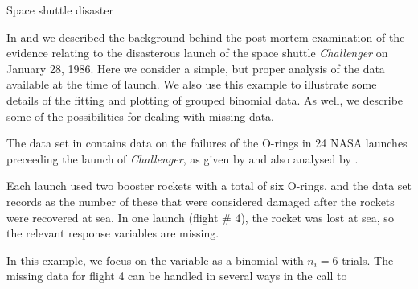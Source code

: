 \documentclass[11pt]{book}
\begin{document}
\begin{Example}{Space shuttle disaster}

In  and  we described the background
behind the post-mortem examination of the evidence relating
to the disasterous launch of the space shuttle \emph{Challenger} on January 28, 1986.
Here we consider a simple, but proper analysis of the data
available at the time of launch.  We also use this example to illustrate
some details of the fitting and plotting of grouped binomial data.
As well, we describe some of the possibilities for dealing with
missing data.

The data set  in  contains
data on the failures of the O-rings in 24 NASA launches
preceeding the launch of \emph{Challenger},
as given by \citet{Dalal-etal:89} and \citet{Tufte:97}
also analysed by \citet{Lavine:91}.

Each launch used two booster rockets with a total of
six O-rings, and the data set records as 
the number of these that were considered damaged after the rockets
were recovered at sea.  In one launch (flight \# 4),
the rocket was lost at sea, so the relevant response variables
are missing.

In this example, we focus on the variable 
as a binomial with $n_i = 6$ trials. The missing data for
flight 4 can be handled in several ways in the call to


\end{Example}
\end{document}
